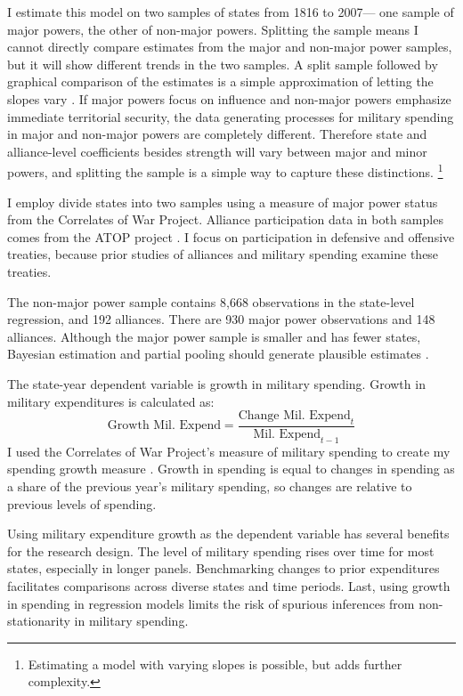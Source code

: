 \documentclass[12pt]{article}
\begin{document}
I estimate this model on two samples of states from 1816 to 2007--- one sample of major powers, the other of non-major powers. 
Splitting the sample means I cannot directly compare estimates from the major and non-major power samples, but it will show different trends in the two samples. 
A split sample followed by graphical comparison of the estimates is a simple approximation of letting the slopes vary \citep{GelmanHill2007}. If major powers focus on influence and non-major powers emphasize immediate territorial security, the data generating processes for military spending in major and non-major powers are completely different.
Therefore state and alliance-level coefficients besides strength will vary between major and minor powers, and splitting the sample is a simple way to capture these distinctions.
\footnote{Estimating a model with varying slopes is possible, but adds further complexity.} 



I employ divide states into two samples using a measure of major power status from the Correlates of War Project. 
Alliance participation data in both samples comes from the ATOP project \citep{Leedsetal2002}. 
I focus on participation in defensive and offensive treaties, because prior studies of alliances and military spending examine these treaties. 


The non-major power sample contains 8,668 observations in the state-level regression, and 192 alliances. 
There are 930 major power observations and 148 alliances. 
Although the major power sample is smaller and has fewer states, Bayesian estimation and partial pooling should generate plausible estimates \citep{Stegmueller2013}. 


The state-year dependent variable is growth in military spending.
Growth in military expenditures is calculated as:
\begin{equation}
\mbox{Growth Mil. Expend} = \frac{ \mbox{Change Mil. Expend}_t }{ \mbox{Mil. Expend}_{t-1} }
\end{equation} 
I used the Correlates of War Project's measure of military spending to create my spending growth measure \citep{SingerCINC1988}. 
Growth in spending is equal to changes in spending as a share of the previous year's military spending, so changes are relative to previous levels of spending. 


Using military expenditure growth as the dependent variable has several benefits for the research design. 
The level of military spending rises over time for most states, especially in longer panels. 
Benchmarking changes to prior expenditures facilitates comparisons across diverse states and time periods. 
Last, using growth in spending in regression models limits the risk of spurious inferences from non-stationarity in military spending.
\end{document}
